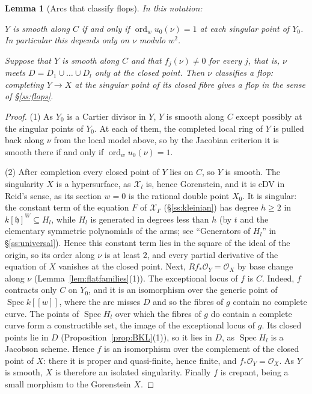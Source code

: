 \documentclass[11pt]{amsart}
\numberwithin{table}{section}
\numberwithin{figure}{section}
\numberwithin{equation}{section}
\newtheorem{lem}[thm]{Lemma}
\theoremstyle{definition}
\theoremstyle{plain}
\newcommand{\cO}{\mathcal{O}}
\newcommand{\cX}{\mathcal{X}}
\newcommand{\h}{\mathfrak{h}}
\DeclareMathOperator{\Spec}{Spec}
\DeclareMathOperator{\ord}{ord}
\begin{document}
\begin{lem}[Arcs that classify flops]\label{lem:arcflop}
In this notation:
\begin{thmlist}
\item $Y$ is smooth along $C$ if and only if $\ord_w u_0(\nu) = 1$ at each singular point of $Y_0$. In particular this depends only on $\nu$ modulo $w^2$.
\item Suppose that $Y$ is smooth along $C$ and that $f_j(\nu) \neq 0$ for every $j$, that is, $\nu$ meets $D = D_1 \cup \dots \cup D_l$ only at the closed point. Then $\nu$ classifies a flop: completing $Y \to X$ at the singular point of its closed fibre gives a flop in the sense of \S\ref{ss:flops}.
\end{thmlist}
\end{lem}

\begin{proof}
(1) As $Y_0$ is a Cartier divisor in $Y$, $Y$ is smooth along $C$ except possibly at the singular points of $Y_0$. At each of them, the completed local ring of $Y$ is pulled back along $\nu$ from the local model above, so by the Jacobian criterion it is smooth there if and only if $\ord_w u_0(\nu) = 1$.

(2) After completion every closed point of $Y$ lies on $C$, so $Y$ is smooth. The singularity $X$ is a hypersurface, as $\cX_l$ is, hence Gorenstein, and it is cDV in Reid's sense, as its section $w = 0$ is the rational double point $X_0$. It is singular: the constant term of the equation $F$ of $\cX_\Gamma$ (\S\ref{ss:kleinian}) has degree $h \ge 2$ in $k[\h]^W \subseteq H_l$, while $H_l$ is generated in degrees less than $h$ (by $t$ and the elementary symmetric polynomials of the arms; see ``Generators of $H_l$'' in \S\ref{ss:universal}). Hence this constant term lies in the square of the ideal of the origin, so its order along $\nu$ is at least $2$, and every partial derivative of the equation of $X$ vanishes at the closed point. Next, $Rf_*\cO_Y = \cO_X$ by base change along $\nu$ (Lemma~\ref{lem:flatfamilies}(1)). The exceptional locus of $f$ is $C$. Indeed, $f$ contracts only $C$ on $Y_0$, and it is an isomorphism over the generic point of $\Spec k[[w]]$, where the arc misses $D$ and so the fibres of $g$ contain no complete curve. The points of $\Spec H_l$ over which the fibres of $g$ do contain a complete curve form a constructible set, the image of the exceptional locus of $g$. Its closed points lie in $D$ (Proposition~\ref{prop:BKL}(1)), so it lies in $D$, as $\Spec H_l$ is a Jacobson scheme. Hence $f$ is an isomorphism over the complement of the closed point of $X$: there it is proper and quasi-finite, hence finite, and $f_*\cO_Y = \cO_X$. As $Y$ is smooth, $X$ is therefore an isolated singularity. Finally $f$ is crepant, being a small morphism to the Gorenstein $X$.
\end{proof}
\end{document}
